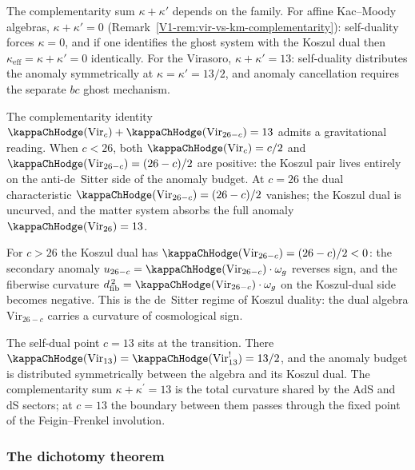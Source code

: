 \begin{remark}
The complementarity sum $\kappa + \kappa'$ depends on the
family. For affine Kac--Moody algebras,
$\kappa + \kappa' = 0$
(Remark~\ref{V1-rem:vir-vs-km-complementarity}):
self-duality forces $\kappa = 0$, and if one identifies the
ghost system with the Koszul dual then
$\kappa_{\mathrm{eff}} = \kappa + \kappa' = 0$
identically. For the Virasoro, $\kappa + \kappa' = 13$:
self-duality distributes the anomaly symmetrically at
$\kappa = \kappa' = 13/2$, and anomaly cancellation
requires the separate $bc$ ghost mechanism.
\end{remark}


\begin{remark}
\label{rem:ads-ds-koszul}
The complementarity identity
$\kappaChHodge(\mathrm{Vir}_c) + \kappaChHodge(\mathrm{Vir}_{26-c}) = 13$
admits a gravitational reading. When $c < 26$, both
$\kappaChHodge(\mathrm{Vir}_c) = c/2$ and
$\kappaChHodge(\mathrm{Vir}_{26-c}) = (26-c)/2$ are positive:
the Koszul pair lives entirely on the anti-de~Sitter side
of the anomaly budget. At $c = 26$ the dual characteristic
$\kappaChHodge(\mathrm{Vir}_{26-c}) = (26-c)/2$ vanishes;
the Koszul dual is uncurved, and the matter system
absorbs the full anomaly $\kappaChHodge(\mathrm{Vir}_{26}) = 13$.

For $c > 26$ the Koszul dual has
$\kappaChHodge(\mathrm{Vir}_{26-c}) = (26-c)/2 < 0$:
the secondary anomaly $u_{26-c} = \kappaChHodge(\mathrm{Vir}_{26-c})\cdot\omega_g$
reverses sign, and the fiberwise curvature
$\dfib^{\,2} = \kappaChHodge(\mathrm{Vir}_{26-c})\cdot\omega_g$
on the Koszul-dual side becomes negative.
This is the de~Sitter regime of Koszul duality:
the dual algebra $\mathrm{Vir}_{26-c}^{}$
carries a curvature of cosmological sign.

The self-dual point $c = 13$ sits at the transition.
There $\kappaChHodge(\mathrm{Vir}_{13}) = \kappaChHodge(\mathrm{Vir}_{13}^!) = 13/2$,
and the anomaly budget is distributed symmetrically
between the algebra and its Koszul dual.
The complementarity sum $\kappa + \kappa^{\prime} = 13$
is the total curvature shared by the AdS and dS sectors;
at $c = 13$ the boundary between them passes through
the fixed point of the Feigin--Frenkel involution.
\end{remark}
\subsubsection{The dichotomy theorem}


